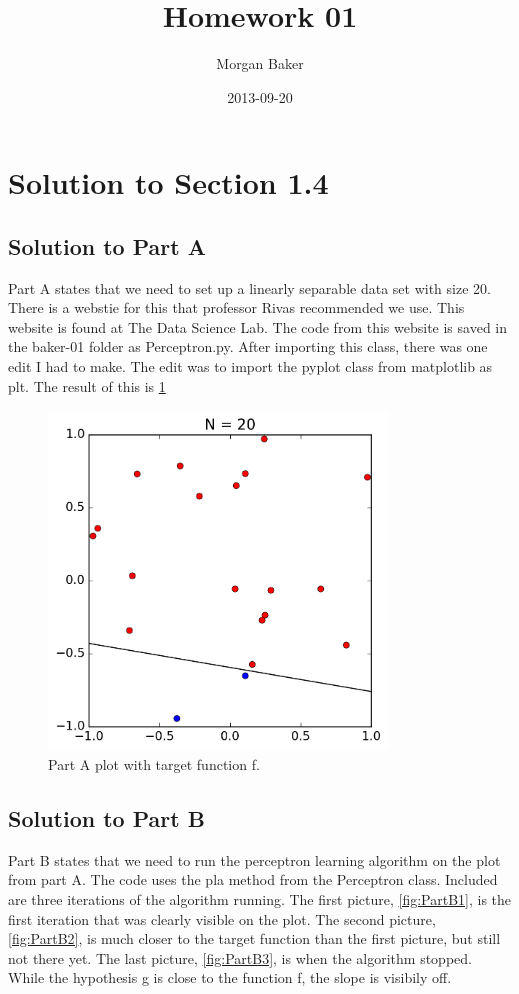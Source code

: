 \documentclass[a4paper]{article}
\title{Homework 01}
\date{2013-09-20}
\author{Morgan Baker}
\begin{document}
\lstset{language=Python}
	
\maketitle

\section{Solution to Section 1.4}
\subsection{Solution to Part A}
Part A states that we need to set up a linearly separable data set with size 20.  There is a webstie for this that professor Rivas recommended we use. This website is found at The Data Science Lab\cite[]{citation01}. The code from this website is saved in the baker-01 folder as Perceptron.py. After importing this class, there was one edit I had to make. The edit was to import the pyplot class from matplotlib as plt. The result of this is \ref {fig:PartA}


\begin{figure}
  \includegraphics[width=9cm,height=9cm]{p_N20.png}
  \caption{Part A plot with target function f.}
  \label{fig:PartA}
\end{figure}

\subsection{Solution to Part B}
Part B states that we need to run the perceptron learning algorithm on the plot from part A. The code uses the pla method from the Perceptron class. Included are three iterations of the algorithm running. The first picture, \ref{fig:PartB1}, is the first iteration that was clearly visible on the plot. The second picture, \ref{fig:PartB2}, is much closer to the target function than the first picture, but still not there yet. The last picture, \ref{fig:PartB3}, is when the algorithm stopped. While the hypothesis g is close to the function f, the slope is visibily off. 
\end{document}
